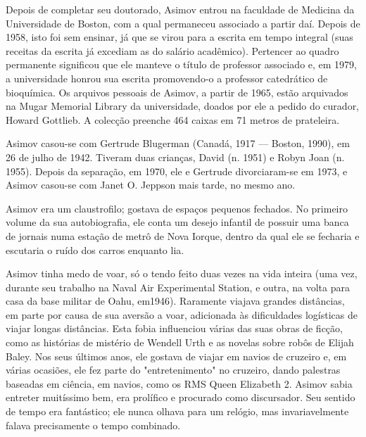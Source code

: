 \documentclass[14pt,portuguese]{extreport}
\begin{document}
      Depois de completar seu doutorado, Asimov entrou na
      faculdade de Medicina da Universidade de Boston, com a qual
      permaneceu associado a partir daí. Depois de 1958, isto foi sem
      ensinar, já que se virou para a escrita em tempo integral (suas
      receitas da escrita já excediam as do salário acadêmico). Pertencer
      ao quadro permanente significou que ele manteve o título de
      professor associado e, em 1979, a universidade honrou sua escrita
      promovendo-o a professor catedrático de bioquímica. Os arquivos
      pessoais de Asimov, a partir de 1965, estão arquivados na Mugar
      Memorial Library da universidade, doados por ele a pedido do
      curador, Howard Gottlieb. A colecção preenche 464 caixas em 71
      metros de prateleira.
      
      Asimov casou-se com Gertrude Blugerman (Canadá, 1917 —
      Boston, 1990), em 26 de julho de 1942. Tiveram duas crianças, David
      (n. 1951) e Robyn Joan (n. 1955). Depois da separação, em 1970, ele
      e Gertrude divorciaram-se em 1973, e Asimov casou-se com Janet O.
      Jeppson mais tarde, no mesmo ano.
      
      Asimov era um claustrofilo; gostava de espaços pequenos
      fechados. No primeiro volume da sua autobiografia, ele conta um
      desejo infantil de possuir uma banca de jornais numa estação de
      metrô de Nova Iorque, dentro da qual ele se fecharia e escutaria o
      ruído dos carros enquanto lia.
      
      Asimov tinha medo de voar, só o tendo feito duas vezes na vida
      inteira (uma vez, durante seu trabalho na Naval Air Experimental
      Station, e outra, na volta para casa da base militar de Oahu, em1946). 
      Raramente viajava grandes distâncias, em parte por causa de
      sua aversão a voar, adicionada às dificuldades logísticas de viajar
      longas distâncias. Esta fobia influenciou várias das suas obras de
      ficção, como as histórias de mistério de Wendell Urth e as novelas
      sobre robôs de Elijah Baley. Nos seus últimos anos, ele gostava de
      viajar em navios de cruzeiro e, em várias ocasiões, ele fez parte do
      "entretenimento" no cruzeiro, dando palestras baseadas em ciência,
      em navios, como os RMS Queen Elizabeth 2. Asimov sabia entreter
      muitíssimo bem, era prolífico e procurado como discursador. Seu
      sentido de tempo era fantástico; ele nunca olhava para um relógio,
      mas invariavelmente falava precisamente o tempo combinado.
      
\end{document}
